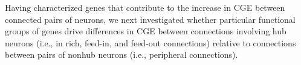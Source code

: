 \documentclass[10pt,letterpaper]{article}
\begin{document}
{%
Having characterized genes that contribute to the increase in CGE between connected pairs of neurons, we next investigated whether particular functional groups of genes drive differences in CGE between connections involving hub neurons (i.e., in rich, feed-in, and feed-out connections) relative to connections between pairs of nonhub neurons (i.e., peripheral connections).
}
\end{document}
